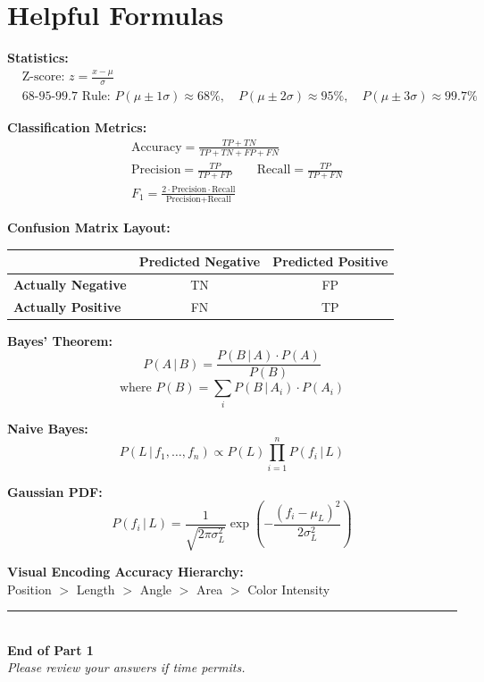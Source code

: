 \documentclass[11pt,a4paper]{article}
\begin{document}
\section*{Helpful Formulas}

\small

\textbf{Statistics:}
\begin{align*}
&\text{Z-score: } z = \frac{x - \mu}{\sigma} \\[0.3cm]
&\text{68-95-99.7 Rule: } P(\mu \pm 1\sigma) \approx 68\%, \quad P(\mu \pm 2\sigma) \approx 95\%, \quad P(\mu \pm 3\sigma) \approx 99.7\%
\end{align*}

\textbf{Classification Metrics:}
\begin{align*}
&\text{Accuracy} = \frac{TP + TN}{TP + TN + FP + FN} \\[0.2cm]
&\text{Precision} = \frac{TP}{TP + FP} \qquad \text{Recall} = \frac{TP}{TP + FN} \\[0.2cm]
&F_1 = \frac{2 \cdot \text{Precision} \cdot \text{Recall}}{\text{Precision} + \text{Recall}}
\end{align*}

\textbf{Confusion Matrix Layout:}
\begin{center}
\begin{tabular}{l|cc}
 & \textbf{Predicted Negative} & \textbf{Predicted Positive} \\
\hline
\textbf{Actually Negative} & TN & FP \\
\textbf{Actually Positive} & FN & TP \\
\end{tabular}
\end{center}

\textbf{Bayes' Theorem:}
$$P(A \,|\, B) = \frac{P(B \,|\, A) \cdot P(A)}{P(B)}$$
$$\text{where } P(B) = \sum_i P(B \,|\, A_i) \cdot P(A_i)$$

\textbf{Naive Bayes:}
$$P(L \,|\, f_1, \ldots, f_n) \propto P(L) \prod_{i=1}^{n} P(f_i \,|\, L)$$

\textbf{Gaussian PDF:}
$$P(f_i \,|\, L) = \frac{1}{\sqrt{2\pi\sigma_L^2}} \exp\!\left(-\frac{(f_i - \mu_L)^2}{2\sigma_L^2}\right)$$

\vspace{0.5cm}
\textbf{Visual Encoding Accuracy Hierarchy:}\\
Position $>$ Length $>$ Angle $>$ Area $>$ Color Intensity

\vspace{0.5cm}
\begin{center}
\noindent\rule{0.5\linewidth}{0.4pt}\\[0.3cm]
\textbf{End of Part 1}\\[0.2cm]
\textit{Please review your answers if time permits.}
\end{center}
\end{document}
